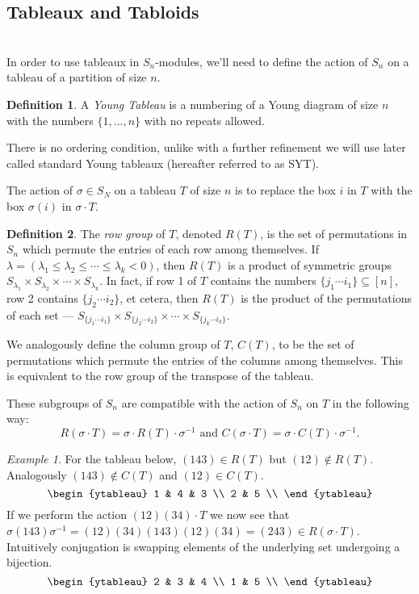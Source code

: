\documentclass[12pt,twoside]{reedthesis}
\theoremstyle{plain}   %
\theoremstyle{definition}
\newtheorem{defn}{Definition}[section]
\theoremstyle{remark}
\newtheorem{ex}{Example}[section]
\numberwithin{equation}{section}
\begin{document}
  \subsection{Tableaux and Tabloids} \hfill\\
  In order to use tableaux in $S_n$-modules, we'll need to define the action of $S_n$ on a tableau of a partition of size $n$.
  \begin{defn}
    A \emph{Young Tableau} is a numbering of a Young diagram of size $n$ with the numbers $\{1,\dots,n\}$ with no
    repeats allowed. \par
    There is no ordering condition, unlike with a further refinement we will use later called standard Young tableaux (hereafter referred to as SYT).
    
  \end{defn}
  The action of $\sigma \in S_N$ on a tableau $T$ of size $n$ is to replace the box $i$ in $T$ with the box $\sigma(i)$ in $\sigma \cdot T$.
  \begin{defn}
    The \emph{row group} of $T$, denoted $R(T)$, is the set of permutations in $S_n$ which permute the entries of each row among themselves.
    If $\lambda = ( \lambda_1 \leq \lambda_2 \leq \cdots \leq \lambda_k < 0)$, then $R(T)$ is a product of symmetric groups
    $S_{\lambda_1} \times S_{\lambda_2} \times \cdots \times S_{\lambda_k}$.
    In fact, if row 1 of $T$ contains the numbers $\{ j_1 \cdots i_1\} \subseteq [n]$, row 2 contains $\{j_2 \cdots i_2 \}$, et cetera,
    then $R(T)$ is the product of the permutations of each set --- $S_{\{ j_1 \cdots i_1\}} \times S_{\{ j_2 \cdots i_2\}} \times \cdots \times S_{\{ j_k \cdots i_k\}}$.\par
    We analogously define the column group of $T$, $C(T)$, to be the set of permutations which permute the entries of the columns among themselves.
    This is equivalent to the row group of the transpose of the tableau.
  \end{defn}
  These subgroups of $S_n$ are compatible with the action of $S_n$ on $T$ in the following way:
  \[ R(\sigma \cdot T) = \sigma \cdot R(T) \cdot \sigma^{-1} \text{ and } C(\sigma \cdot T) = \sigma \cdot C(T) \cdot \sigma^{-1}.\]
  \begin{ex}
    For the tableau below,
    $(143) \in R(T)$ but $(12) \notin R(T)$.
    Analogously $(143) \notin C(T)$ and $(12) \in C(T)$.
    \[
      \begin{ytableau}
        1 & 4 & 3 \\
        2 & 5 \\
      \end{ytableau}
    \]
    If we perform the action $(12)(34) \cdot T$ we now see that $\sigma (143) \sigma^{-1} = (12)(34) (143) (12)(34) = (243) \in R(\sigma \cdot T)$.
    Intuitively conjugation is swapping elements of the underlying set undergoing a bijection.
    \[
      \begin{ytableau}
        2 & 3 & 4 \\
        1 & 5 \\
      \end{ytableau}
    \]
  \end{ex}
\end{document}
